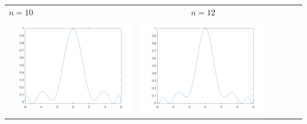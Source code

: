 \begin{tabular}{l*{5}{c}}
\hspace{3.5cm}\(n=10\) &  \(n=12\) \\
\includegraphics[scale=0.5]{cap4/4_7/10.png} &  \includegraphics[scale=0.5]{cap4/4_7/12.png} \\
\end{tabular} \\ \\

